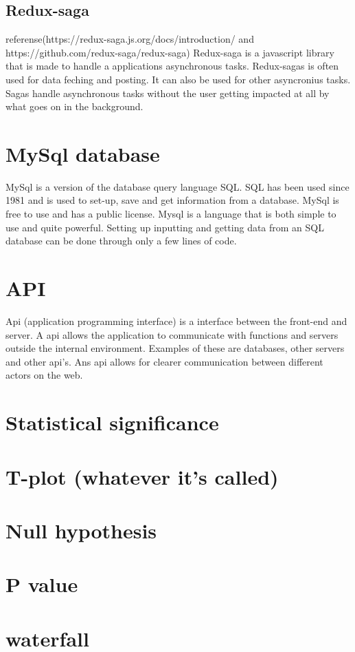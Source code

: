 \subsection{Redux-saga}
referense(https://redux-saga.js.org/docs/introduction/ and https://github.com/redux-saga/redux-saga) Redux-saga is a javascript library that is made to handle a applications asynchronous tasks. Redux-sagas is often used for data feching and posting. It can also be used for other asyncronius tasks. Sagas handle asynchronous tasks without the user getting impacted at all by what goes on in the background.

\section{MySql database}
MySql is a version of the database query language SQL. SQL has been used since 1981 and is used to set-up, save and get information from a database. MySql is free to use and has a public license. Mysql is a language that is both simple to use and quite powerful. Setting up inputting and getting data from an SQL database can be done through only a  few lines of code.

\section{API}
Api (application programming interface) is a interface between the front-end and server. A api allows the application to communicate with functions and servers outside the internal environment. Examples of these are databases, other servers and other api's. Ans api allows for clearer communication between different actors on the web. 

\section{Statistical significance}

\section{T-plot (whatever it's called)}
\section{Null hypothesis}
\section{P value}
\section{waterfall}



